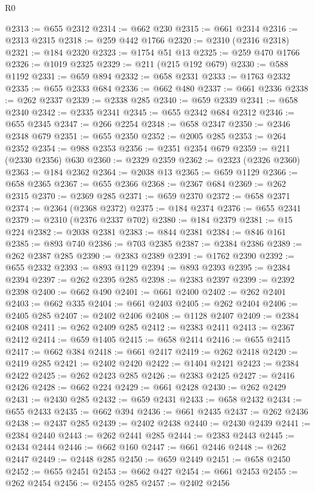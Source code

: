 \begin{lexlean}{R0}
\begin{coremodule}
@2313 := @655 @2312
@2314 := @662 @230
@2315 := @661 @2314
@2316 := @2313 @2315
@2318 := @259 @442 @1766
@2320 := @2310 (@2316 @2318)
@2321 := @184 @2320
@2323 := @1754 @51 @13
@2325 := @259 @470 @1766
@2326 := @1019 @2325
@2329 := @211 (@215 @192 @679)
@2330 := @588 @1192
@2331 := @659 @894
@2332 := @658 @2331
@2333 := @1763 @2332
@2335 := @655 @2333 @684
@2336 := @662 @480
@2337 := @661 @2336
@2338 := @262 @2337
@2339 := @2338 @285
@2340 := @659 @2339
@2341 := @658 @2340
@2342 := @2335 @2341
@2345 := @655 @2342 @684 @2312
@2346 := @655 @2345
@2347 := @266 @2254
@2348 := @658 @2347
@2350 := @2346 @2348 @679
@2351 := @655 @2350
@2352 := @2005 @285
@2353 := @264 @2352
@2354 := @988 @2353
@2356 := @2351 @2354 @679
@2359 := @211 (@2330 @2356) @630
@2360 := @2329 @2359
@2362 := @2323 (@2326 @2360)
@2363 := @184 @2362
@2364 := @2038 @13
@2365 := @659 @1129
@2366 := @658 @2365
@2367 := @655 @2366
@2368 := @2367 @684
@2369 := @262 @2315
@2370 := @2369 @285
@2371 := @659 @2370
@2372 := @658 @2371
@2374 := @2364 (@2368 @2372)
@2375 := @184 @2374
@2376 := @655 @2341
@2379 := @2310 (@2376 @2337 @702)
@2380 := @184 @2379
@2381 := @15 @224
@2382 := @2038 @2381
@2383 := @844 @2381
@2384 := @846 @161
@2385 := @893 @740
@2386 := @703 @2385
@2387 := @2384 @2386
@2389 := @262 @2387 @285
@2390 := @2383 @2389
@2391 := @1762 @2390
@2392 := @655 @2332
@2393 := @893 @1129
@2394 := @893 @2393
@2395 := @2384 @2394
@2397 := @262 @2395 @285
@2398 := @2383 @2397
@2399 := @2392 @2398
@2400 := @662 @490
@2401 := @661 @2400
@2402 := @262 @2401
@2403 := @662 @335
@2404 := @661 @2403
@2405 := @262 @2404
@2406 := @2405 @285
@2407 := @2402 @2406
@2408 := @1128 @2407
@2409 := @2384 @2408
@2411 := @262 @2409 @285
@2412 := @2383 @2411
@2413 := @2367 @2412
@2414 := @659 @1405
@2415 := @658 @2414
@2416 := @655 @2415
@2417 := @662 @384
@2418 := @661 @2417
@2419 := @262 @2418
@2420 := @2419 @285
@2421 := @2402 @2420
@2422 := @1404 @2421
@2423 := @2384 @2422
@2425 := @262 @2423 @285
@2426 := @2383 @2425
@2427 := @2416 @2426
@2428 := @662 @224
@2429 := @661 @2428
@2430 := @262 @2429
@2431 := @2430 @285
@2432 := @659 @2431
@2433 := @658 @2432
@2434 := @655 @2433
@2435 := @662 @394
@2436 := @661 @2435
@2437 := @262 @2436
@2438 := @2437 @285
@2439 := @2402 @2438
@2440 := @2430 @2439
@2441 := @2384 @2440
@2443 := @262 @2441 @285
@2444 := @2383 @2443
@2445 := @2434 @2444
@2446 := @662 @160
@2447 := @661 @2446
@2448 := @262 @2447
@2449 := @2448 @285
@2450 := @659 @2449
@2451 := @658 @2450
@2452 := @655 @2451
@2453 := @662 @427
@2454 := @661 @2453
@2455 := @262 @2454
@2456 := @2455 @285
@2457 := @2402 @2456

\end{coremodule}
\end{lexlean}
